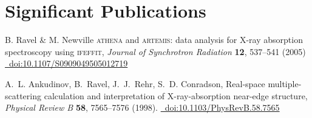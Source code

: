 \documentclass[11pt]{moderncv}
\begin{document}



\section{Significant Publications}
\label{sec:highlights}

%
{\small B. Ravel \& M. Newville \textsc{athena} and
  \textsc{artemis}: data analysis for X-ray absorption spectroscopy
  using \textsc{ifeffit}, \emph{Journal of Synchrotron Radiation}
  \textbf{12}, 537--541 (2005)
  \href{https://doi.org/10.1107/S0909049505012719}
  {\color{color2}\homepagesymbol~doi:10.1107/S0909049505012719}}

%
{\small A.~L. Ankudinov,  B.~Ravel,  J.~J.~Rehr,  S.~D. Conradson,
  Real-space multiple-scattering calculation and interpretation of
  X-ray-absorption near-edge structure, \emph{Physical Review B}
  \textbf{58}, 7565--7576 (1998).
  \href{https://doi.org/10.1103/PhysRevB.58.7565}
  {\color{color2}\homepagesymbol~doi:10.1103/PhysRevB.58.7565}}
\end{document}
